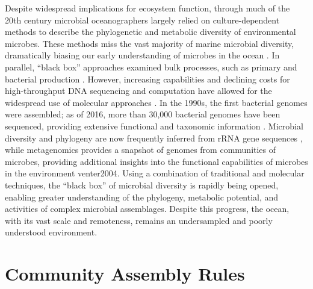 Despite widespread implications for ecosystem function, through much of the 20th century microbial oceanographers largely relied on culture-dependent methods to describe the phylogenetic and metabolic diversity of environmental microbes. These methods miss the vast majority of marine microbial diversity, dramatically biasing our early understanding of microbes in the ocean \citep{Staley1985-hf}. In parallel, ``black box'' approaches examined bulk processes, such as primary and bacterial production \citep{karl2007history}. However, increasing capabilities and declining costs for high-throughput DNA sequencing and computation have allowed for the widespread use of molecular approaches \citep{schloss2004;Sunagawa1261359}. In the 1990s, the first bacterial genomes were assembled; as of 2016, more than 30,000 bacterial genomes have been sequenced, providing extensive functional and taxonomic information \citep{Land2015-yf}. Microbial diversity and phylogeny are now frequently inferred from rRNA gene sequences \citep{Woese1987-ps,Pace2009-ck}, while metagenomics provides a snapshot of genomes from communities of microbes, providing additional insights into the functional capabilities of microbes in the environment {venter2004}. Using a combination of traditional and molecular techniques, the ``black box'' of microbial diversity is rapidly being opened, enabling greater understanding of the phylogeny, metabolic potential, and activities of complex microbial assemblages. Despite this progress, the ocean, with its vast scale and remoteness, remains an undersampled and poorly understood environment.

\section{Community Assembly Rules}
 
